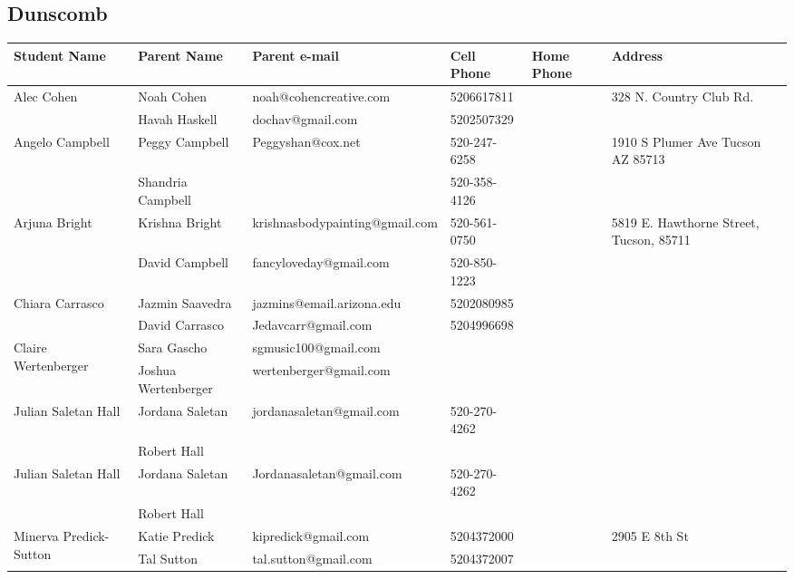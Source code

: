 \documentclass[landscape]{article}\usepackage[]{graphicx}\usepackage[]{color}
\begin{document}
\subsection{Dunscomb}
\begin{longtable}{|p{100pt}|p{100pt}|p{140pt}|p{60pt}|p{64pt}|p{120pt}|}
\textbf{Student Name} & \textbf{Parent Name} & \textbf{Parent e-mail} & \textbf{Cell Phone} & \textbf{Home Phone} & \textbf{Address}\\
\hline
\hline
\multirow{2}{100pt}{Alec Cohen} & Noah Cohen & noah@cohencreative.com & 5206617811 &  & \multirow{2}{120pt}{328 N. Country Club Rd.} \\
 & Havah Haskell & dochav@gmail.com & 5202507329 &  & \\
\hline
\multirow{2}{100pt}{Angelo Campbell } & Peggy Campbell  & Peggyshan@cox.net & 520-247-6258 &  & \multirow{2}{120pt}{1910 S Plumer Ave Tucson AZ 85713} \\
 & Shandria Campbell  &  & 520-358-4126 &  & \\
\hline
\multirow{2}{100pt}{Arjuna Bright} & Krishna Bright & krishnasbodypainting@gmail.com & 520-561-0750 &  & \multirow{2}{120pt}{5819 E. Hawthorne Street, Tucson, 85711} \\
 & David Campbell & fancyloveday@gmail.com & 520-850-1223 &  & \\
\hline
\multirow{2}{100pt}{Chiara Carrasco} & Jazmin Saavedra & jazmins@email.arizona.edu & 5202080985 &  & \multirow{2}{120pt}{} \\
 & David Carrasco & Jedavcarr@gmail.com & 5204996698 &  & \\
\hline
\multirow{2}{100pt}{Claire Wertenberger} & Sara Gascho & sgmusic100@gmail.com &  &  & \multirow{2}{120pt}{} \\
 & Joshua Wertenberger & wertenberger@gmail.com &  &  & \\
\hline
\multirow{2}{100pt}{Julian Saletan Hall} & Jordana Saletan & jordanasaletan@gmail.com & 520-270-4262 &  & \multirow{2}{120pt}{} \\
 & Robert Hall &  &  &  & \\
\hline
\multirow{2}{100pt}{Julian Saletan Hall} & Jordana Saletan & Jordanasaletan@gmail.com & 520-270-4262 &  & \multirow{2}{120pt}{} \\
 & Robert Hall &  &  &  & \\
\hline
\multirow{2}{100pt}{Minerva Predick-Sutton} & Katie Predick & kipredick@gmail.com & 5204372000 &  & \multirow{2}{120pt}{2905 E 8th St} \\
 & Tal Sutton & tal.sutton@gmail.com & 5204372007 &  & \\

\end{longtable}
\end{document}
